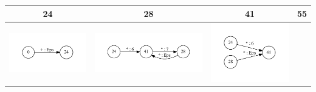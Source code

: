 \documentclass{matmex-diploma}
\begin{document}
\begin{table}[h]
  \centering
  \begin{tabular}{ | c | c | c | c | }
    \hline
    24 & 28 & 41 & 55 \\ \hline
    \begin{minipage}{.22\textwidth}
      \includegraphics[width=\linewidth]{24_inv}
    \end{minipage}
    &
    \begin{minipage}{.22\textwidth}
      \includegraphics[width=\linewidth]{28_inv}
    \end{minipage}
    & 
    \begin{minipage}{.22\textwidth}
      \includegraphics[width=\linewidth]{41_inv}

\end{minipage}
\end{tabular}
\end{table}
\end{document}
